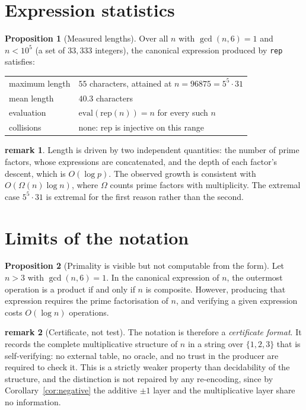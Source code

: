 \documentclass[11pt]{article}
\theoremstyle{definition}
\newtheorem{proposition}{Proposition}
\newtheorem{remark}{remark}
\begin{document}
\section{Expression statistics}

\begin{proposition}[Measured lengths]
Over all $n$ with $\gcd(n,6)=1$ and $n < 10^{5}$ (a set of $33{,}333$
integers), the canonical expression produced by \texttt{rep} satisfies:
\begin{center}
\begin{tabular}{ll}
  maximum length & $55$ characters, attained at $n = 96875 = 5^5\cdot 31$ \\
  mean length    & $40.3$ characters \\
  evaluation     & $\mathrm{eval}(\mathrm{rep}(n)) = n$ for every such $n$ \\
  collisions     & none: $\mathrm{rep}$ is injective on this range
\end{tabular}
\end{center}
\end{proposition}

\begin{remark}
Length is driven by two independent quantities: the number of prime factors,
whose expressions are concatenated, and the depth of each factor's descent,
which is $O(\log p)$. The observed growth is consistent with
$O(\Omega(n)\log n)$, where $\Omega$ counts prime factors with multiplicity.
The extremal case $5^5\cdot 31$ is extremal for the first reason rather than
the second.
\end{remark}

\section{Limits of the notation}

\begin{proposition}[Primality is visible but not computable from the form]
Let $n>3$ with $\gcd(n,6)=1$. In the canonical expression of $n$, the
outermost operation is a product if and only if $n$ is composite. However,
producing that expression requires the prime factorisation of $n$, and
verifying a given expression costs $O(\log n)$ operations.
\end{proposition}

\begin{remark}[Certificate, not test]
The notation is therefore a \emph{certificate format}. It records the complete
multiplicative structure of $n$ in a string over $\{1,2,3\}$ that is
self-verifying: no external table, no oracle, and no trust in the producer are
required to check it. This is a strictly weaker property than decidability of
the structure, and the distinction is not repaired by any re-encoding, since
by Corollary~\ref{cor:negative} the additive $\pm1$ layer and the
multiplicative layer share no information.
\end{remark}
\end{document}
